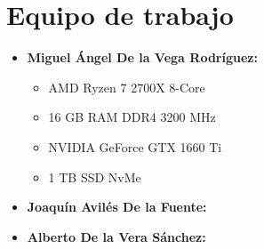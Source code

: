 \documentclass[11pt]{article}
\begin{document}
                                                

\tableofcontents %

\newpage %

\section{Equipo de trabajo}
\begin{itemize}
    \item \textbf{Miguel Ángel De la Vega Rodríguez:}
        \begin{itemize}
            \item AMD Ryzen 7 2700X 8-Core
            \item 16 GB RAM DDR4 3200 MHz
            \item NVIDIA GeForce GTX 1660 Ti 
            \item 1 TB SSD NvMe 
        \end{itemize}
    \item \textbf{Joaquín Avilés De la Fuente:}
    \item \textbf{Alberto De la Vera Sánchez:}
\end{itemize}
\end{document}
